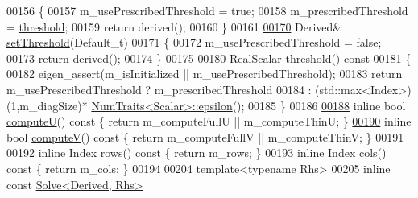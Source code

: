 \begin{DoxyCode}
00156   \{
00157     m\_usePrescribedThreshold = \textcolor{keyword}{true};
00158     m\_prescribedThreshold = \hyperlink{group___s_v_d___module_a98b2ee98690358951807353812a05c69}{threshold};
00159     \textcolor{keywordflow}{return} derived();
00160   \}
00161 
\hyperlink{group___s_v_d___module_a27586b69dbfb63f714d1d45fd6304f97}{00170}   Derived& \hyperlink{group___s_v_d___module_a27586b69dbfb63f714d1d45fd6304f97}{setThreshold}(Default\_t)
00171   \{
00172     m\_usePrescribedThreshold = \textcolor{keyword}{false};
00173     \textcolor{keywordflow}{return} derived();
00174   \}
00175 
\hyperlink{group___s_v_d___module_a98b2ee98690358951807353812a05c69}{00180}   RealScalar \hyperlink{group___s_v_d___module_a98b2ee98690358951807353812a05c69}{threshold}()\textcolor{keyword}{ const}
00181 \textcolor{keyword}{  }\{
00182     eigen\_assert(m\_isInitialized || m\_usePrescribedThreshold);
00183     \textcolor{keywordflow}{return} m\_usePrescribedThreshold ? m\_prescribedThreshold
00184                                     : (std::max<Index>)(1,m\_diagSize)*
      \hyperlink{group___core___module_struct_eigen_1_1_num_traits}{NumTraits<Scalar>::epsilon}();
00185   \}
00186 
\hyperlink{group___s_v_d___module_a705a7c2709e1624ccc19aa748a78d473}{00188}   \textcolor{keyword}{inline} \textcolor{keywordtype}{bool} \hyperlink{group___s_v_d___module_a705a7c2709e1624ccc19aa748a78d473}{computeU}()\textcolor{keyword}{ const }\{ \textcolor{keywordflow}{return} m\_computeFullU || m\_computeThinU; \}
\hyperlink{group___s_v_d___module_a5f12efcb791eb007d4a4890ac5255ac4}{00190}   \textcolor{keyword}{inline} \textcolor{keywordtype}{bool} \hyperlink{group___s_v_d___module_a5f12efcb791eb007d4a4890ac5255ac4}{computeV}()\textcolor{keyword}{ const }\{ \textcolor{keywordflow}{return} m\_computeFullV || m\_computeThinV; \}
00191 
00192   \textcolor{keyword}{inline} Index rows()\textcolor{keyword}{ const }\{ \textcolor{keywordflow}{return} m\_rows; \}
00193   \textcolor{keyword}{inline} Index cols()\textcolor{keyword}{ const }\{ \textcolor{keywordflow}{return} m\_cols; \}
00194   
00204   \textcolor{keyword}{template}<\textcolor{keyword}{typename} Rhs>
00205   \textcolor{keyword}{inline} \textcolor{keyword}{const} \hyperlink{group___core___module_class_eigen_1_1_solve}{Solve<Derived, Rhs>}

\end{DoxyCode}
